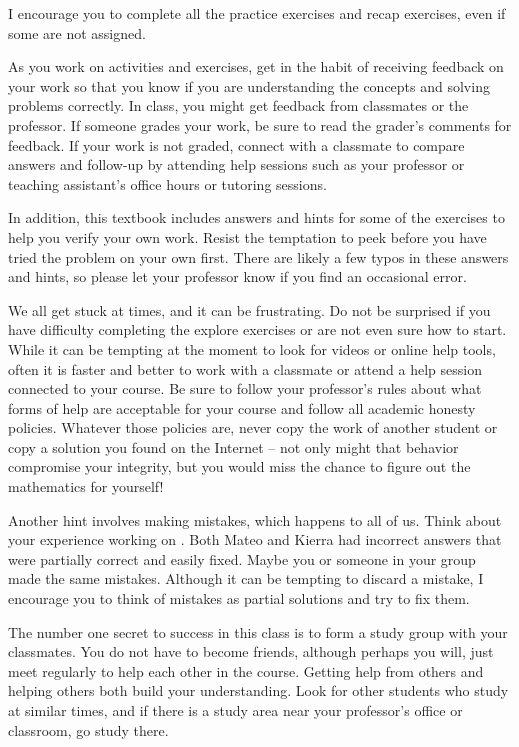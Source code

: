I encourage you to complete all the practice exercises and recap exercises, even if some are not assigned.  

As you work on activities and exercises, get in the habit of receiving feedback on your work so that you know if you are understanding the concepts and solving problems correctly.  In class, you might get feedback from classmates or the professor.  If someone grades your work, be sure to read the grader's comments for feedback. If your work is not graded, connect with a classmate to compare answers and follow-up by attending help sessions such as your professor or teaching assistant's office hours or tutoring sessions. 

In addition, this textbook includes answers and hints for some of the exercises to help you verify your own work.  Resist the temptation to peek before you have tried the problem on your own first. There are likely a few typos in these answers and hints, so please let your professor know if you find an occasional error.

We all get stuck at times, and it can be frustrating.  Do not be surprised if you have difficulty completing the explore exercises or are not even sure how to start.  While it can be tempting at the moment to look for videos or online help tools, often it is faster and better to work with a classmate or attend a help session connected to your course.  Be sure to follow your professor's rules about what forms of help are acceptable for your course and follow all academic honesty policies. Whatever those policies are, 
never copy the work of another student or copy a solution you found on the Internet -- not only might that behavior compromise your integrity, but you would miss the chance to figure out the mathematics for yourself!

Another hint involves making mistakes, which happens to all of us.  Think about your experience working on .  Both Mateo and Kierra had incorrect answers that were partially correct and easily fixed.  Maybe you or someone in your group made the same mistakes.  Although it can be tempting to discard a mistake, I encourage you to think of mistakes as partial solutions and try to fix them.  

The number one secret to success in this class is to form a study group with your classmates.  You do not have to become friends, although perhaps you will, just meet regularly to help each other in the course. Getting help from others and helping others both build your understanding. Look for other students who study at similar times, and if there is a study area near your professor's office or classroom, go study there.

